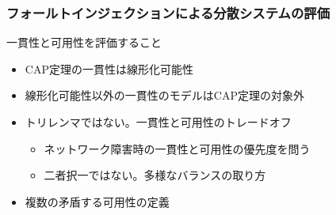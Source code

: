 \documentclass[unicode, 14pt, aspectratio=169]{beamer}
\begin{document}
\begin{frame}
  \frametitle{フォールトインジェクションによる分散システムの評価}
  {\large 一貫性と可用性を評価すること}
  \begin{description}[font=\normalfont]
  \item[\textcolor{highlight}{CAP定理の問題}]
  \begin{itemize}[leftmargin=0cm,topsep=0pt,before=\leavevmode\vspace{8pt}]
  \item CAP定理\supercite{cap}の一貫性は線形化可能性\supercite{linearizability} 
  \item 線形化可能性以外の一貫性のモデルはCAP定理の対象外
  \item トリレンマではない。一貫性と可用性のトレードオフ\supercite{cap-twelve-years-later}
    \begin{itemize}
    \item ネットワーク障害時の一貫性と可用性の優先度を問う
    \item 二者択一ではない。多様なバランスの取り方
    \end{itemize}
  \item 複数の矛盾する可用性の定義\supercite{kleppmann}    
  \end{itemize}    
  \end{description}

\end{frame}
\end{document}
